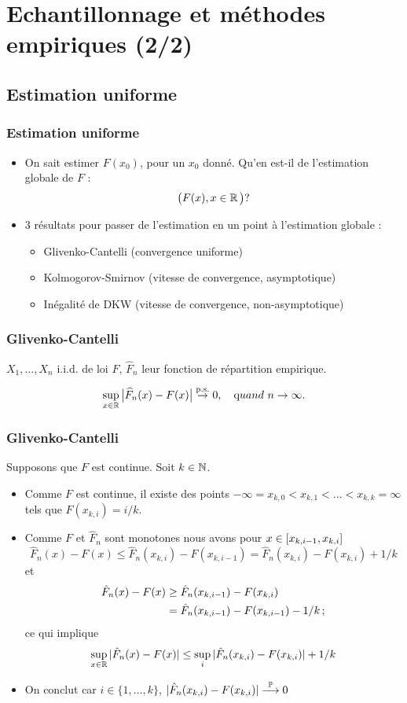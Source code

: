 \section{Echantillonnage et méthodes empiriques (2/2)}
\subsection{Estimation uniforme}
\begin{frame}
\frametitle{Estimation uniforme}
\begin{itemize}
\item On \og sait \fg{} estimer $F(x_0)$, pour un $x_0$ donné. Qu'en est-il de l'estimation \alert{globale} de $F$ :
$$\big(F(x), x \in \operatorname{{\mathbb R}}\big) ?$$
\item 3 résultats pour passer de l'estimation en un point à \alert{l'estimation globale} :
\begin{itemize}
\item Glivenko-Cantelli (convergence uniforme)
\item Kolmogorov-Smirnov (vitesse de convergence, asymptotique)
\item Inégalité de DKW (vitesse de convergence, non-asymptotique)
\end{itemize}
\end{itemize}
\end{frame}
\begin{frame}
\frametitle{Glivenko-Cantelli}
$X_1,\ldots, X_n$ i.i.d. de loi $F$, $\widehat F_n$ leur fonction de répartition empirique.
\begin{theo}
$$\sup_{x \in \operatorname{{\mathbb R}}}\big|\widehat F_n(x)-F(x)\big|
\stackrel{\mathrm{p.s.}}{\rightarrow}0, \quad {\text quand} \ n\to
\infty.$$
\end{theo}
\end{frame}
\begin{frame}
\frametitle{Glivenko-Cantelli}
Supposons que $F$ est continue. Soit $k \in \mathbb{N}$.
\begin{itemize}
\item Comme $F$ est continue, il existe des points $-\infty= x_{k,0} < x_{k,1} < \dots < x_{k,k}= \infty$ tels que $F(x_{k,i})= i /k$.
\item Comme $F$ et $\hat{F}_n$ sont \alert{monotones} nous avons pour $x \in \left[x_{k,i-1},x_{k,i}\right]$
\begin{equation*}
\hat{F}_n(x) - F(x) \leq \hat{F}_n(x_{k,i}) - F(x_{k,i-1})= \hat{F}_n(x_{k,i}) - F(x_{k,i}) + 1/k
\end{equation*}
et
\begin{align*}
\hat{F}_n(x) - F(x) &\geq \hat{F}_n(x_{k,i-1}) - F(x_{k,i}) \\
&= \hat{F}_n(x_{k,i-1})- F(x_{k,i-1}) - 1/k \,;
\end{align*}
ce qui implique
\[
\sup_{x \in \mathbb{R}} |\hat{F}_n(x) - F(x)| \leq \sup_i |\hat{F}_n(x_{k,i}) - F(x_{k,i})| + 1/k
\]
\pause \item On conclut car $i \in \{1,\dots,k\}$, $|\hat{F}_n(x_{k,i})- F(x_{k,i})| \stackrel{\operatorname{{\mathbb P}}}{\longrightarrow} 0$
\end{itemize}
\end{frame}

